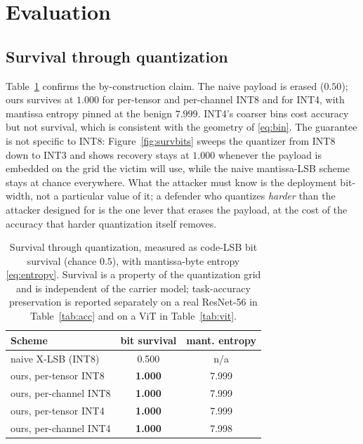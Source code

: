 \documentclass[a4paper,fleqn]{cas-dc}
\theoremstyle{plain}
\theoremstyle{remark}
\begin{document}
\section{Evaluation}\label{sec:eval}
\subsection{Survival through quantization}
Table~\ref{tab:survive} confirms the by-construction claim. The naive payload is erased
($0.50$); ours survives at $1.000$ for per-tensor and per-channel INT8 and for INT4,
with mantissa entropy pinned at the benign $7.999$. INT4's coarser bins cost accuracy
but not survival, which is consistent with the geometry of \eqref{eq:bin}. The guarantee
is not specific to INT8: Figure~\ref{fig:survbits} sweeps the quantizer from INT8 down to
INT3 and shows recovery stays at $1.000$ whenever the payload is embedded on the grid the
victim will use, while the naive mantissa-LSB scheme stays at chance everywhere. What the
attacker must know is the deployment bit-width, not a particular value of it; a defender
who quantizes \emph{harder} than the attacker designed for is the one lever that erases the
payload, at the cost of the accuracy that harder quantization itself removes.

\begin{table}[!tb]\centering
\caption{Survival through quantization, measured as code-LSB bit survival (chance $0.5$),
with mantissa-byte entropy \eqref{eq:entropy}. Survival is a property of the quantization
grid and is independent of the carrier model; task-accuracy preservation is reported
separately on a real ResNet-56 in Table~\ref{tab:acc} and on a ViT in Table~\ref{tab:vit}.}
\label{tab:survive}
\begin{tabular*}{\columnwidth}{@{\extracolsep{\fill}}lcc@{}}
\toprule
Scheme & bit survival & mant. entropy\\
\midrule
naive X-LSB (INT8) & 0.500 & n/a\\
ours, per-tensor INT8 & \textbf{1.000} & 7.999\\
ours, per-channel INT8 & \textbf{1.000} & 7.999\\
ours, per-tensor INT4 & \textbf{1.000} & 7.999\\
ours, per-channel INT4 & \textbf{1.000} & 7.998\\
\bottomrule
\end{tabular*}
\end{table}
\end{document}
